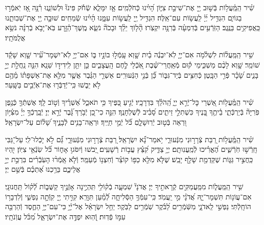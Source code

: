 \documentclass[twoside, openany, parskip=half, 11pt]{book}
\begin{document}
שִׁ֗יר הַֽמַּֽ֫עֲל֥וֹת בְּֿשׁ֣וּב יְ֖יָ אֶת־שִׁיבַ֣ת צִיּ֑וֹן הָ֝יִ֗ינוּ כְּֿחֹלְֿמִֽים׃ אָ֤ז יִמָּלֵ֢א שְֿׂחֹ֡ק פִּינוּ֘ וּלְשׁוֹנֵ֢נוּ רִ֫נָּ֥ה אָ֭ז יֹֽאמְֿר֣וּ בַגּוֹיִ֑ם הִגְדִּ֥יל יְ֜יָ֗ לַֽעֲשׂ֥וֹת עִם־אֵֽלֶּה׃ הִגְדִּ֥יל יְ֖יָ לַֽעֲשׂ֣וֹת עִמָּ֑נוּ הָ֜יִ֗ינוּ שְֿׂמֵחִֽים׃ שׁוּבָ֣ה יְ֖יָ אֶת־שְׁבִותֵ֑נוּ כַּֽאֲפִיקִ֥ים בַּנֶּֽגֶב׃ הַזֹּֽרְֿעִ֥ים בְּֿדִמְעָ֗ה בְּֿרִנָּ֥ה יִקְצֹֽרוּ׃ הָ֘ל֤וֹךְ יֵלֵ֨ךְ וּבָכֹה֘ נֹשֵׂ֢א מֶֽשֶׁךְ־הַ֫זָּ֥רַע בֹּֽא־יָבֹ֥א בְֿרִנָּ֗ה נֹשֵׂ֥א אֲלֻמֹּתָֽיו׃

שִׁ֥יר הַֽמַּֽעֲל֗וֹת לִשְׁלֹ֫מֹ֥ה אִם־יְיָ֤ לֹֽא־יִבְנֶ֬ה בַ֗יִת שָׁ֤וְא עָֽמְֿל֣וּ בוֹנָ֣יו בּ֑וֹ אִם־יְיָ֥ לֹֽא־יִשְׁמָר־עִ֝֗יר שָׁ֤וְא שָׁקַ֬ד שׁוֹמֵֽר׃ שָׁ֤וְא לָכֶ֨ם מַשְׁכִּ֑ימֵי ק֡וּם מְֿאַֽחֲרֵי־שֶׁ֗בֶת אֹֽ֭כְֿלֵי לֶ֣חֶם הָֽעֲצָבִ֑ים כֵּ֤ן יִתֵּ֖ן לִֽידִיד֣וֹ שֵׁנָֽא׃ הִנֵּ֤ה נַֽחֲלַ֣ת יְיָ֣ בָּנִ֑ים שָׂ֝כָ֗ר פְּֿרִ֣י הַבָּֽטֶן׃ כְּֿחִצִּ֥ים בְּֿיַד־גִּבּ֑וֹר כֵּ֝֗ן בְּֿנֵ֣י הַנְּֿעוּרִֽים׃ אַשְׁרֵ֤י הַגֶּ֗בֶר אֲשֶׁ֤ר מִלֵּ֥א אֶת־אַשְׁפָּת֗וֹ מֵ֫הֶ֥ם לֹ֥א יֵב֑שׁוּ כִּֽי־יְֿדַבְּֿר֖וּ אֶת־אֹֽיְֿבִ֣ים בַּשָּֽׁעַר׃

שִׁ֗יר הַֽמַּֽ֫עֲל֥וֹת אַ֭שְׁרֵי כׇּל־יְֿרֵ֣א יְיָ֑ הַֽ֝הֹלֵ֗ךְ בִּדְרָכָֽיו׃ יְֿגִ֣יעַ כַּ֭פֶּיךָ כִּ֥י תֹאכֵ֑ל אַ֝שְׁרֶ֗יךָ וְֿט֣וֹב לָֽךְ׃ אֶשְׁתְּֿךָ֤ כְּֿגֶ֥פֶן פֹּֽרִיָּה֘ בְּֿיַרְכְּֿתֵ֢י בֵ֫יתֶ֥ךָ בָּ֭נֶיךָ כִּשְׁתִלֵ֣י זֵיתִ֑ים סָ֝בִ֗יב לְֿשֻׁלְחָנֶֽךָ׃ הִנֵּ֣ה כִי־כֵ֭ן יְֿבֹ֥רַךְ ֝גָּ֗בֶר יְֿרֵ֣א יְיָ׃ יְֿבָֽרֶכְֿךָ֥ יְיָ֗ מִצִּ֫יּ֥וֹן וּ֭רְאֵה בְּֿט֣וּב יְֿרֽוּשָׁלָ֑םִ כֹּ֝֗ל יְֿמֵ֣י חַיֶּֽיךָ׃ וּרְאֵֽה־בָנִ֥ים לְֿבָנֶ֑יךָ שָׁ֝ל֗וֹם עַל־יִשְׂרָאֵֽל׃

שִׁ֗יר הַֽמַּֽ֫עֲל֥וֹת רַ֭בַּת צְֿרָר֣וּנִי מִנְּֿעוּרַ֑י יֹ֥אמַר־נָ֝֗א יִשְׂרָאֵֽל׃ רַ֭בַּת צְֿרָר֣וּנִי מִנְּֿעוּרָ֑י גַּ֝֗ם לֹ֣א יָכְֿלוּ־לִֽי׃ עַל־גַּ֭בִּי חָֽרְֿשׁ֣וּ חֹֽרְֿשִׁ֑ים הֶ֝אֱרִ֗יכוּ לְֿמַֽעֲנִותָֽם׃ יְיָ֥ צַדִּ֑יק קִ֝צֵּ֗ץ עֲב֣וֹת רְֿשָׁעִֽים׃ יֵ֭בשׁוּ וְֿיִסֹּגוּ֣ אָח֑וֹר כֹּ֝֗ל שֽׂנְֿאֵ֥י צִיּֽוֹן׃ יִֽ֭הְיוּ כַּֽחֲצִ֣יר גַּגּ֑וֹת שֶׁקַּדְמַ֖ת שָׁלַ֣ף יָבֵֽשׁ׃ שֶׁלֹּ֤א מִלֵּ֖א כַפּ֥וֹ קוֹצֵ֗ר וְֿחִצְנ֥וֹ מְֿעַמֵּֽר׃ וְֿלֹ֤א אָֽמְֿר֨וּ הָעֹֽבְֿרִ֗ים בִּרְכַּ֣ת יְיָ֣ אֲלֵיכֶ֑ם בֵּרַ֥כְנוּ אֶ֝תְכֶ֗ם בְּֿשֵׁ֣ם יְיָ׃

שִׁ֥יר הַֽמַּֽעֲל֑וֹת מִמַּֽעֲמַקִּ֖ים קְֿרָאתִ֣יךָ יְיָ׃ אֲדֹנָי֘ שִׁמְעָ֢ה בְֿק֫וֹלִ֥י תִּֽהְיֶ֣ינָה אָזְֿנֶ֣יךָ קַשֻּׁב֑וֹת לְֿ֝ק֗וֹל תַּֽחֲנוּנָֽי׃ אִם־עֲוֹנ֥וֹת תִּשְׁמָר־יָ֑הּ אֲ֝דֹנָ֗י מִ֣י יַֽעֲמֹֽד׃ כִּֽי־עִמְּֿךָ֥ הַסְּֿלִיחָ֑ה לְֿ֝מַ֗עַן תִּוָּרֵֽא׃ קִוִּ֣יתִי יְ֖יָ קִוְּֿתָ֣ה נַפְשִׁ֑י וְֽֿלִדְבָר֥וֹ הוֹחָֽלְֿתִּי׃ נַפְשִׁ֣י לַֽאדֹנָ֑י מִשֹּֽֿׁמְֿרִ֥ים לַ֝בֹּ֗קֶר שֹֽׁמְֿרִ֥ים לַבֹּֽקֶר׃ יַחֵ֥ל יִשְׂרָאֵ֗ל אֶל־יְ֫יָ֥ כִּי־עִם־יְיָ֥ הַחֶ֑סֶד וְֿהַרְבֵּ֖ה עִמּ֣וֹ פְֿדֽוּת׃ וְֿ֭הֽוּא יִפְדֶּ֣ה אֶת־יִשְׂרָאֵ֑ל מִ֝כֹּ֗ל עֲוֹֽנֹתָֽיו׃
\end{document}

